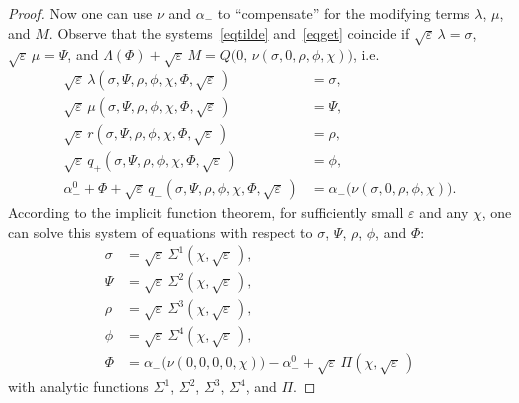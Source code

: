 \documentclass[12pt,reqno]{amsart}
\theoremstyle{definition}
\begin{document}
\begin{proof}
Now one can use $\nu$ and $\alpha_-$ to ``compensate'' for the modifying terms
$\lambda$, $\mu$, and $M$. Observe that the systems~\eqref{eqtilde}
and~\eqref{eqget} coincide if ${{\sqrt{\varepsilon}}\,}\lambda=\sigma$, ${{\sqrt{\varepsilon}}\,}\mu=\Psi$, and
$\Lambda(\Phi)+{{\sqrt{\varepsilon}}\,} M=Q\bigl(0, \, \nu(\sigma,0,\rho,\phi,\chi)\bigr)$, i.e.
\begin{align*}
{{\sqrt{\varepsilon}}\,}\lambda(\sigma,\Psi,\rho,\phi,\chi,\Phi,{{\sqrt{\varepsilon}}\,}) &= \sigma, \\
{{\sqrt{\varepsilon}}\,}\mu(\sigma,\Psi,\rho,\phi,\chi,\Phi,{{\sqrt{\varepsilon}}\,}) &= \Psi, \\
{{\sqrt{\varepsilon}}\,} r(\sigma,\Psi,\rho,\phi,\chi,\Phi,{{\sqrt{\varepsilon}}\,}) &= \rho, \\
{{\sqrt{\varepsilon}}\,} q_+(\sigma,\Psi,\rho,\phi,\chi,\Phi,{{\sqrt{\varepsilon}}\,}) &= \phi, \\
\alpha^0_-+\Phi+{{\sqrt{\varepsilon}}\,} q_-(\sigma,\Psi,\rho,\phi,\chi,\Phi,{{\sqrt{\varepsilon}}\,}) &=
\alpha_-\bigl(\nu(\sigma,0,\rho,\phi,\chi)\bigr).
\end{align*}
According to the implicit function theorem, for sufficiently small ${\varepsilon}$ and
any $\chi$, one can solve this system of equations with respect to $\sigma$,
$\Psi$, $\rho$, $\phi$, and $\Phi$:
\begin{align*}
\sigma &= {{\sqrt{\varepsilon}}\,}\Sigma^1(\chi,{{\sqrt{\varepsilon}}\,}), \\
\Psi &= {{\sqrt{\varepsilon}}\,}\Sigma^2(\chi,{{\sqrt{\varepsilon}}\,}), \\
\rho &= {{\sqrt{\varepsilon}}\,}\Sigma^3(\chi,{{\sqrt{\varepsilon}}\,}), \\
\phi &= {{\sqrt{\varepsilon}}\,}\Sigma^4(\chi,{{\sqrt{\varepsilon}}\,}), \\
\Phi &= \alpha_-\bigl(\nu(0,0,0,0,\chi)\bigr)-\alpha^0_-+{{\sqrt{\varepsilon}}\,}\Pi(\chi,{{\sqrt{\varepsilon}}\,})
\end{align*}
with analytic functions $\Sigma^1$, $\Sigma^2$, $\Sigma^3$, $\Sigma^4$, and
$\Pi$.


\end{proof}
\end{document}
